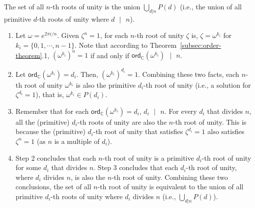\begin{tcolorbox}[title={\textbf{\tboxtheorem{\ref*{subsec:roots-theorem}.3} Set of All $\bm{n}$-th Roots of Unity}}]
The set of all $n$-th roots of unity is the union $\bigcup_{d|n} P(d)$ (i.e., the union of all primitive $d$-th roots of unity where $d \text{ } | \text{ } n$).
\end{tcolorbox}
\begin{myproof}
    \begin{enumerate}
    \item Let $\omega = e^{2\pi i/n}$.
    Given $\zeta^n = 1$, for each $n$-th root of unity $\zeta$ is, $\zeta = \omega^{k_i}$ for $k_i = \{0, 1, \cdots, n-1\}$. Note that according to Theorem~\ref*{subsec:order-theorem}.1, $(\omega^{k_i})^n = 1$ if and only if $\textsf{ord}_{\mathbb{C}}(\omega^{k_i}) \text{ } | \text{ } n$. 
    \item Let $\textsf{ord}_{\mathbb{C}}(\omega^{k_i}) = d_i$. Then, $(\omega^{k_i})^{d_i} = 1$. Combining these two facts, each $n$-th root of unity $\omega^{k_i}$ is also the primitive $d_i$-th root of unity (i.e., a solution for $\zeta^{d_i} = 1$), that is, $\omega^{k_i} \in P(d_i)$. 
    \item Remember that for each $\textsf{ord}_{\mathbb{C}}(\omega^{k_i}) = d_i$, $d_i \text{ } | \text{ } n$. For every $d_i$ that divides $n$, all the (primitive) $d_i$-th roots of unity are also the $n$-th root of unity. This is because the (primitive) $d_i$-th root of unity that satisfies $\zeta^{d_i} = 1$ also satisfies $\zeta^{n} = 1$ (as $n$ is a multiple of $d_i$).
    \item Step 2 concludes that each $n$-th root of unity is a primitive $d_i$-th root of unity for some $d_i$ that divides $n$. Step 3 concludes that each $d_i$-th root of unity, where $d_i$ divides $n$, is also the $n$-th root of unity. Combining these two conclusions, the set of all $n$-th root of unity is equivalent to the union of all primitive $d_i$-th roots of unity where $d_i$ divides $n$ (i.e., $\bigcup_{d|n} P(d)$). 
    \end{enumerate}
\end{myproof}

